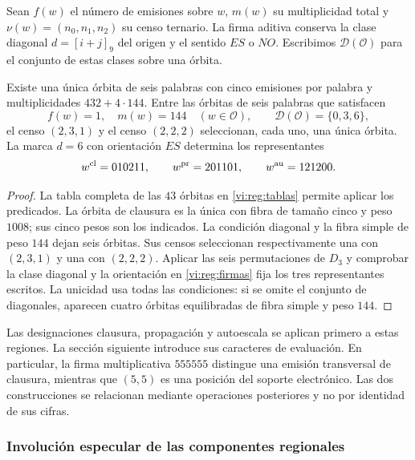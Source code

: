 Sean \(f(w)\) el número de emisiones sobre \(w\), \(m(w)\)
su multiplicidad total y \(\nu(w)=(n_0,n_1,n_2)\) su censo
ternario. La firma aditiva conserva la clase diagonal
\(d=[i+j]_9\) del origen y el sentido \(ES\) o \(NO\).
Escribimos \(\mathcal D(\mathcal O)\) para el conjunto de estas
clases sobre una órbita.

\begin{proposition}
\label{vi:reg:seleccion}
Existe una única órbita de seis palabras con cinco emisiones por
palabra y multiplicidades \(432+4\cdot144\). Entre las órbitas
de seis palabras que satisfacen
\[
 f(w)=1,\quad m(w)=144\quad(w\in\mathcal O),\qquad
 \mathcal D(\mathcal O)=\{0,3,6\},
\]
el censo \((2,3,1)\) y el censo \((2,2,2)\) seleccionan,
cada uno, una única órbita. La marca \(d=6\) con orientación
\(ES\) determina los representantes
\[
 w^{\rm cl}=010211,\qquad w^{\rm pr}=201101,
 \qquad w^{\rm au}=121200.
\]
\end{proposition}
\begin{proof}
La tabla completa de las \(43\) órbitas en
\ref{vi:reg:tablas} permite aplicar los predicados. La órbita de
clausura es la única con fibra de tamaño cinco y peso \(1008\);
sus cinco pesos son los indicados. La condición diagonal y la
fibra simple de peso \(144\) dejan seis órbitas. Sus censos
seleccionan respectivamente una con \((2,3,1)\) y una con
\((2,2,2)\). Aplicar las seis permutaciones de \(D_3\) y
comprobar la clase diagonal y la orientación en
\eqref{vi:reg:firmas} fija los tres representantes escritos.
La unicidad usa todas las condiciones: si se omite el conjunto de
diagonales, aparecen cuatro órbitas equilibradas de fibra simple
y peso \(144\).
\end{proof}

Las designaciones clausura, propagación y autoescala se aplican
primero a estas regiones. La sección siguiente introduce sus
caracteres de evaluación. En particular, la firma multiplicativa
\(555555\) distingue una emisión transversal de clausura, mientras
que \((5,5)\) es una posición del soporte electrónico. Las dos
construcciones se relacionan mediante operaciones posteriores y no
por identidad de sus cifras.

\subsubsection{Involución especular de las componentes regionales}
\label{mono-ampl:regiones}

